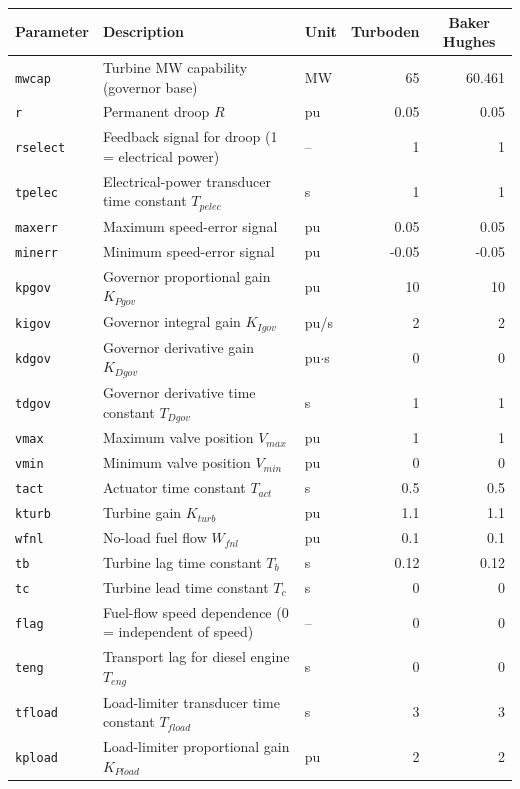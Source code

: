 \begin{tabularx}{\linewidth}{@{}l X l r r@{}}
\toprule
\textbf{Parameter} & \textbf{Description} & \multicolumn{1}{c}{\textbf{Unit}} & \multicolumn{1}{c}{\textbf{Turboden}} & \multicolumn{1}{c}{\textbf{Baker Hughes}} \\
\midrule
\texttt{mwcap} & Turbine MW capability (governor base) & MW & 65 & 60.461 \\
\texttt{r} & Permanent droop $R$ & pu & 0.05 & 0.05 \\
\texttt{rselect} & Feedback signal for droop (1 = electrical power) & -- & 1 & 1 \\
\texttt{tpelec} & Electrical-power transducer time constant $T_{pelec}$ & s & 1 & 1 \\
\texttt{maxerr} & Maximum speed-error signal & pu & 0.05 & 0.05 \\
\texttt{minerr} & Minimum speed-error signal & pu & -0.05 & -0.05 \\
\texttt{kpgov} & Governor proportional gain $K_{Pgov}$ & pu & 10 & 10 \\
\texttt{kigov} & Governor integral gain $K_{Igov}$ & pu/s & 2 & 2 \\
\texttt{kdgov} & Governor derivative gain $K_{Dgov}$ & pu$\cdot$s & 0 & 0 \\
\texttt{tdgov} & Governor derivative time constant $T_{Dgov}$ & s & 1 & 1 \\
\texttt{vmax} & Maximum valve position $V_{max}$ & pu & 1 & 1 \\
\texttt{vmin} & Minimum valve position $V_{min}$ & pu & 0 & 0 \\
\texttt{tact} & Actuator time constant $T_{act}$ & s & 0.5 & 0.5 \\
\texttt{kturb} & Turbine gain $K_{turb}$ & pu & 1.1 & 1.1 \\
\texttt{wfnl} & No-load fuel flow $W_{fnl}$ & pu & 0.1 & 0.1 \\
\texttt{tb} & Turbine lag time constant $T_b$ & s & 0.12 & 0.12 \\
\texttt{tc} & Turbine lead time constant $T_c$ & s & 0 & 0 \\
\texttt{flag} & Fuel-flow speed dependence (0 = independent of speed) & -- & 0 & 0 \\
\texttt{teng} & Transport lag for diesel engine $T_{eng}$ & s & 0 & 0 \\
\texttt{tfload} & Load-limiter transducer time constant $T_{fload}$ & s & 3 & 3 \\
\texttt{kpload} & Load-limiter proportional gain $K_{Pload}$ & pu & 2 & 2 \\

\end{tabularx}
